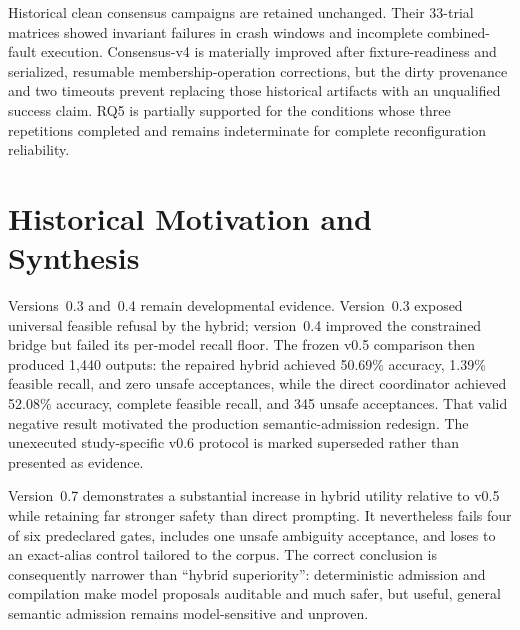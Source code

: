 Historical clean consensus campaigns are retained unchanged. Their 33-trial matrices showed invariant failures in crash windows and incomplete combined-fault execution. Consensus-v4 is materially improved after fixture-readiness and serialized, resumable membership-operation corrections, but the dirty provenance and two timeouts prevent replacing those historical artifacts with an unqualified success claim. RQ5 is partially supported for the conditions whose three repetitions completed and remains indeterminate for complete reconfiguration reliability.

\section{Historical Motivation and Synthesis}

Versions~0.3 and~0.4 remain developmental evidence. Version~0.3 exposed universal feasible refusal by the hybrid; version~0.4 improved the constrained bridge but failed its per-model recall floor. The frozen v0.5 comparison then produced 1,440 outputs: the repaired hybrid achieved 50.69\% accuracy, 1.39\% feasible recall, and zero unsafe acceptances, while the direct coordinator achieved 52.08\% accuracy, complete feasible recall, and 345 unsafe acceptances. That valid negative result motivated the production semantic-admission redesign. The unexecuted study-specific v0.6 protocol is marked superseded rather than presented as evidence.

Version~0.7 demonstrates a substantial increase in hybrid utility relative to v0.5 while retaining far stronger safety than direct prompting. It nevertheless fails four of six predeclared gates, includes one unsafe ambiguity acceptance, and loses to an exact-alias control tailored to the corpus. The correct conclusion is consequently narrower than ``hybrid superiority'': deterministic admission and compilation make model proposals auditable and much safer, but useful, general semantic admission remains model-sensitive and unproven.
